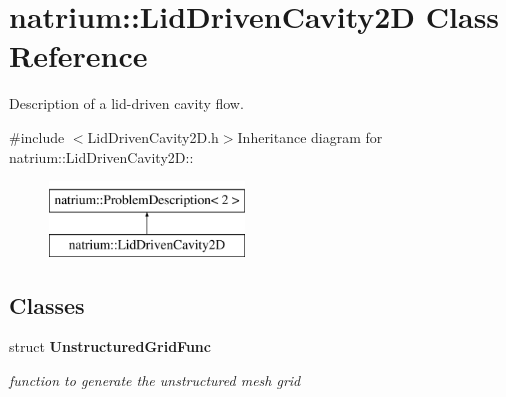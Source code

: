 \hypertarget{classnatrium_1_1LidDrivenCavity2D}{
\section{natrium::LidDrivenCavity2D Class Reference}
\label{classnatrium_1_1LidDrivenCavity2D}
}


Description of a lid-\/driven cavity flow.  


{\ttfamily \#include $<$LidDrivenCavity2D.h$>$}Inheritance diagram for natrium::LidDrivenCavity2D::\begin{figure}[H]
\begin{center}
\leavevmode
\includegraphics[height=2cm]{classnatrium_1_1LidDrivenCavity2D}
\end{center}
\end{figure}
\subsection*{Classes}
\begin{DoxyCompactItemize}
\item 
struct {\bfseries UnstructuredGridFunc}
\begin{DoxyCompactList}\small\item\em function to generate the unstructured mesh grid \item\end{DoxyCompactList}\end{DoxyCompactItemize}
